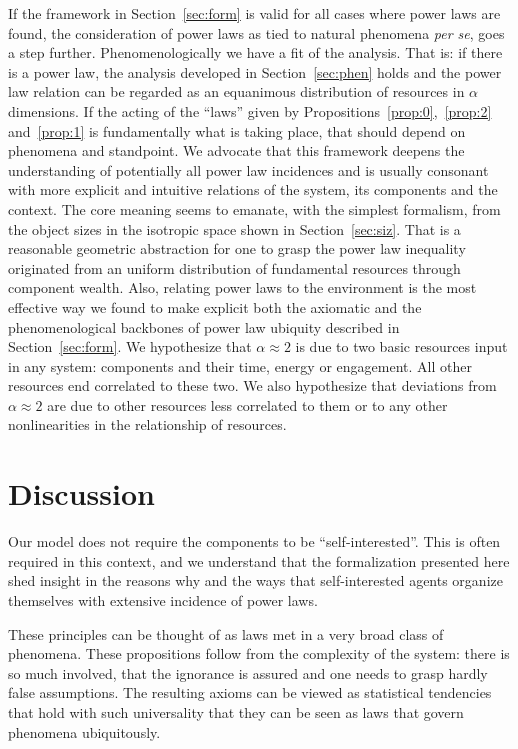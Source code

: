 \documentclass[a4paper, 11pt]{article} %
\begin{document}
If the framework in Section~\ref{sec:form} is valid for all cases where power laws are found,
the consideration of power laws as tied to natural phenomena \emph{per se}, goes a step further. 
Phenomenologically we have a fit of the analysis.
That is: if there is
a power law, the analysis developed in Section~\ref{sec:phen} holds
and
the power law relation can be regarded as an equanimous distribution
of resources in $\alpha$ dimensions.
If the acting of the ``laws'' given by Propositions~\ref{prop:0},~\ref{prop:2} and~\ref{prop:1} is fundamentally what is taking place, that should depend on phenomena
and standpoint.
We advocate that this framework deepens the understanding of potentially all power law
incidences and is usually consonant with more explicit and intuitive 
relations of the system, its components and the context.
The core meaning seems to emanate, with the simplest formalism, from
the object sizes in the isotropic space shown in Section~\ref{sec:siz}.
That is a reasonable geometric abstraction for
one to grasp the power law inequality originated from
an uniform distribution
of fundamental resources through component wealth.
Also, relating power laws to the environment is the most effective
way we found to make explicit both the axiomatic
and the phenomenological backbones of power law ubiquity described in
Section~\ref{sec:form}.
We hypothesize that $\alpha \approx 2$ is due to two basic resources
input in any system: components and their time, energy or engagement.
All other resources end correlated to these two.
We also hypothesize that deviations from $\alpha \approx 2$ are due
to other resources less correlated to them
or to any other nonlinearities in the relationship of resources.

\section{Discussion}
Our model does not require the components to be ``self-interested''.
This is often required in this context, and 
we understand that the formalization presented here shed insight
in the reasons why and the ways that self-interested agents
organize themselves with extensive incidence of power laws.

These principles can be thought of as laws met in
a very broad class of phenomena.
These propositions follow from the complexity of the system:
there is so much involved, that the ignorance is assured and
one needs to grasp hardly false assumptions.
The resulting axioms can be viewed as statistical tendencies that
hold with such universality that they can be seen as laws
that govern phenomena ubiquitously.
\end{document}
